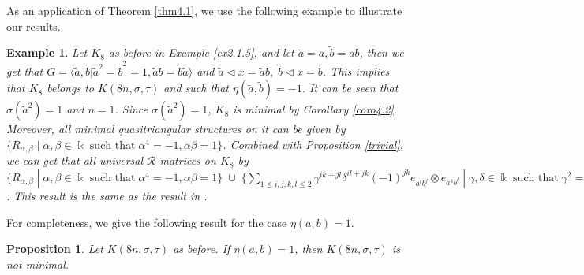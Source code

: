 \documentclass[a4paper,11pt]{amsart}
\numberwithin{equation}{section}
\newtheorem{proposition}[theorem]{Proposition}
\newtheorem{example}[theorem]{Example}
\begin{document}
As an application of Theorem \ref{thm4.1}, we use the following example to illustrate our
results.

\begin{example}
\emph{
Let $K_8$ as before in Example \ref{ex2.1.5}, and let $\tilde{a}=a,\tilde{b}=ab$, then we get that $G=\langle \tilde{a},\tilde{b}|\tilde{a}^2=\tilde{b}^2=1,\tilde{a}\tilde{b}=\tilde{b}\tilde{a}\rangle$ and $\tilde{a}\triangleleft x=\tilde{a}\tilde{b},\;\tilde{b}\triangleleft x=\tilde{b}$. This implies that $K_8$ belongs to $K(8n,\sigma,\tau)$ and such that $\eta(\tilde{a},\tilde{b})=-1$. It can be seen that $\sigma(\tilde{a}^2)=1$ and $n=1$. Since $\sigma(\tilde{a}^2)=1$,  $K_8$ is minimal by Corollary \ref{coro4.2}. Moreover, all minimal quasitriangular structures on it can be given by
 $\{R_{\alpha,\beta}\;|\;\alpha,\beta\in \Bbbk\;\text{such that}\; \alpha^4=-1, \alpha\beta=1\}$.
Combined with Proposition \ref{trivial}, we can get that all universal $\mathcal{R}$-matrices on $K_8$ by   $\{R_{\alpha,\beta}\;|\;\alpha,\beta\in \Bbbk\;\text{such that}\; \alpha^4=-1, \alpha\beta=1\}\; \cup \;\{\sum_{1\leq i,j,k,l \leq 2}\gamma^{ik+jl}\delta^{il+jk}(-1)^{jk} e_{a^i b^j} \otimes e_{a^k b^l}\;|\; \gamma,\delta \in \Bbbk \;\text{such that}\; \gamma^2=\delta^2=1\}$. This result is the same as the result in \cite[Lemma 5.4]{W}.}
\end{example}
For completeness, we give the following result for the case $\eta(a,b)=1$.
\begin{proposition}
Let $K(8n,\sigma,\tau)$ as before. If $\eta(a,b)=1$, then $K(8n,\sigma,\tau)$ is not minimal.
\end{proposition}
\end{document}
